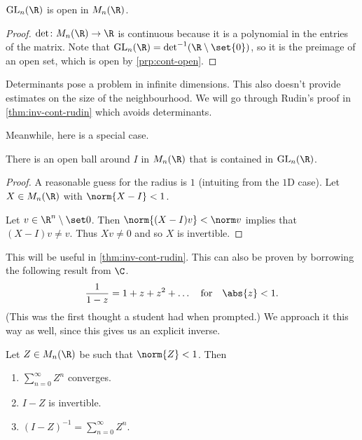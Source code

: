 \begin{proposition*}
    $\GL_n(\R)$ is open in $M_n(\R)$.
\end{proposition*}
\begin{proof}
    $\det \colon M_n(\R) \to \R$ is continuous because
    it is a polynomial in the entries of the matrix.
    Note that $\GL_n(\R) = \det^{-1}(\R \setminus \set{0})$,
    so it is the preimage of an open set, which is open
    by \cref{prp:cont-open}.
\end{proof}
Determinants pose a problem in infinite dimensions.
This also doesn't provide estimates on the size of the neighbourhood.
We will go through Rudin's proof in \cref{thm:inv-cont-rudin}
which avoids determinants.

Meanwhile, here is a special case.
\begin{lemma} \label{thm:gln-open-i}
    There is an open ball around $I$ in $M_n(\R)$
    that is contained in $\GL_n(\R)$.
\end{lemma}
\begin{proof}
    A reasonable guess for the radius is $1$ (intuiting from the $1$D case).
    Let $X \in M_n(\R)$ with $\norm{X - I} < 1$.

    Let $v \in \R^n \setminus \set 0$.
    Then $\norm{(X - I)v} < \norm v$ implies that $(X - I)v \ne v$.
    Thus $Xv \ne 0$ and so $X$ is invertible.
\end{proof}
This will be useful in \cref{thm:inv-cont-rudin}.
This can also be proven by borrowing the following result from $\C$. \[
    \frac1{1-z} = 1 + z + z^2 + \ldots \quad \text{for} \quad \abs{z} < 1.
\]
(This was the first thought a student had when prompted.)
We approach it this way as well, since this gives us an explicit inverse.
\begin{lemma*} \label{thm:inv-series}
    Let $Z \in M_n(\R)$ be such that $\norm{Z} < 1$.
    Then
    \begin{enumerate}
        \item $\sum_{n=0}^\infty Z^n$ converges.
        \item $I - Z$ is invertible.
        \item $(I - Z)^{-1} = \sum_{n=0}^\infty Z^n$.
    \end{enumerate}
\end{lemma*}

